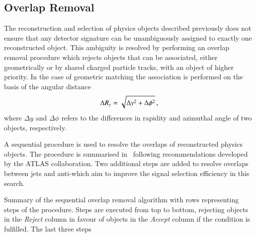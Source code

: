 \subsection{Overlap Removal}%
\label{sec:overlap_removal}

The reconstruction and selection of physics objects described
previously does not ensure that any detector signature can be
unambiguously assigned to exactly one reconstructed object. This
ambiguity is resolved by performing an overlap removal procedure which
rejects objects that can be associated, either geometrically or by
shared charged particle tracks, with an object of higher priority. In
the case of geometric matching the association is performed on the
basis of the angular distance
\begin{align*}
  \Delta R_y = \sqrt{\Delta y^2 + \Delta \phi^2} \,\text{,}
\end{align*}
where $\Delta y$ and $\Delta \phi$ refers to the differences in rapidity and
azimuthal angle of two objects, respectively.

A sequential procedure is used to resolve the overlaps of
reconstructed physics objects. The procedure is summarised
in~ following recommendations developed by
the ATLAS collaboration. Two additional steps are added to resolve
overlaps between jets and anti-\tauhadvis which aim to improve the
signal selection efficiency in this search.

\begin{table}[htbp]
  \centering


  \caption{Summary of the sequential overlap removal algorithm with
    rows representing steps of the procedure. Steps are executed from
    top to bottom, rejecting objects in the \emph{Reject} column in
    favour of objects in the \emph{Accept} column if the condition is
    fulfilled. The last three steps }%
  \label{tab:overlap_removal}

  \resizebox{\textwidth}{!}{%
    
  }
\end{table}

